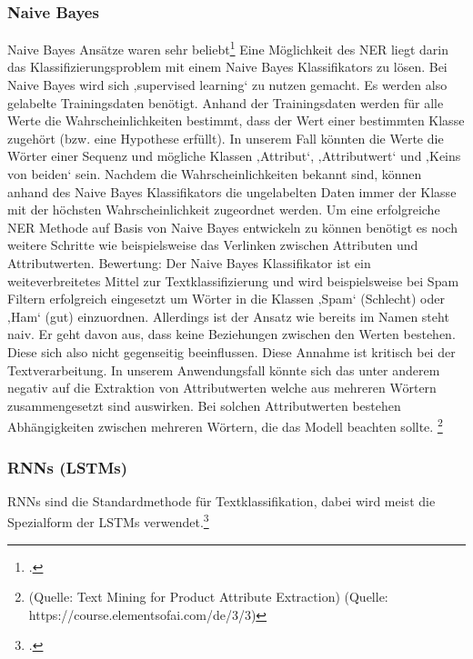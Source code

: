 \documentclass[paper=a4,12pt,listof=totoc]{scrartcl}%
\begin{document}
	\subsubsection{Naive Bayes}
	Naive Bayes Ansätze waren sehr beliebt\footcite{Ghani.2006}
	Eine Möglichkeit des NER liegt darin das Klassifizierungsproblem mit einem Naive Bayes Klassifikators zu lösen. Bei Naive Bayes wird sich ‚supervised learning‘ zu nutzen gemacht. Es werden also gelabelte Trainingsdaten benötigt. Anhand der Trainingsdaten werden für alle Werte die Wahrscheinlichkeiten bestimmt, dass der Wert einer bestimmten Klasse zugehört (bzw. eine Hypothese erfüllt). In unserem Fall könnten die Werte die Wörter einer Sequenz und mögliche Klassen ‚Attribut‘, ‚Attributwert‘ und ‚Keins von beiden‘ sein. Nachdem die Wahrscheinlichkeiten bekannt sind, können anhand des Naive Bayes Klassifikators die ungelabelten Daten immer der Klasse mit der höchsten Wahrscheinlichkeit zugeordnet werden. Um eine erfolgreiche NER Methode auf Basis von Naive Bayes entwickeln zu können benötigt es noch weitere Schritte wie beispielsweise das Verlinken zwischen Attributen und Attributwerten. 
	Bewertung: Der Naive Bayes Klassifikator ist ein weiteverbreitetes Mittel zur Textklassifizierung und wird beispielsweise bei Spam Filtern erfolgreich eingesetzt um Wörter in die Klassen ‚Spam‘ (Schlecht) oder ‚Ham‘ (gut) einzuordnen. Allerdings ist der Ansatz wie bereits im Namen steht naiv. Er geht davon aus, dass keine Beziehungen zwischen den Werten bestehen. Diese sich also nicht gegenseitig beeinflussen. Diese Annahme ist kritisch bei der Textverarbeitung. In unserem Anwendungsfall könnte sich das unter anderem negativ auf die Extraktion von Attributwerten welche aus mehreren Wörtern zusammengesetzt sind auswirken. Bei solchen Attributwerten bestehen Abhängigkeiten zwischen mehreren Wörtern, die das Modell beachten sollte.
	\footnote{(Quelle: Text Mining for Product Attribute Extraction)
	(Quelle: https://course.elementsofai.com/de/3/3)}
	\subsubsection{RNNs (LSTMs)}
	RNNs sind die Standardmethode für Textklassifikation, dabei wird meist die Spezialform der LSTMs verwendet.\footcite{Majumder.30.03.2018}
\end{document}
